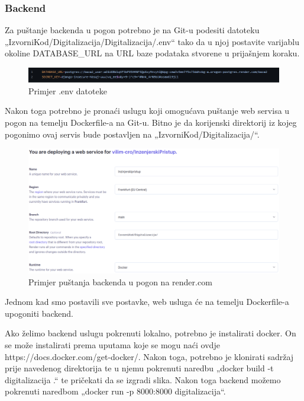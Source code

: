 			\subsubsection{Backend}

			Za puštanje backenda u pogon potrebno je na Git-u podesiti datoteku „IzvorniKod/Digitalizacija/Digitalizacija/.env“
			tako da u njoj postavite varijablu okoline DATABASE_URL na URL baze podataka stvorene u prijašnjem koraku.

			\begin{figure}[H]
				\includegraphics[width=\textwidth]{slike/envFile.png}
				\caption{Primjer .env datoteke}
				\label{fig:env_datoteka}
			\end{figure}

			Nakon toga potrebno je pronaći uslugu koji omogućava puštanje web servisa u pogon na temelju Dockerfile-a na Git-u.
			Bitno je da korijenski direktorij iz kojeg pogonimo ovaj servis bude postavljen na „IzvorniKod/Digitalizacija/“. 

			\begin{figure}[H]
				\includegraphics[width=\textwidth]{slike/deployingBackend.png}
				\caption{Primjer puštanja backenda u pogon na render.com}
				\label{fig:deploying-backend}
			\end{figure}

			Jednom kad smo postavili sve postavke, web usluga će na temelju Dockerfile-a upogoniti backend.

			Ako želimo backend uslugu pokrenuti lokalno, potrebno je instalirati docker. On se može instalirati prema uputama
			koje se mogu naći ovdje https://docs.docker.com/get-docker/.
			Nakon toga, potrebno je klonirati sadržaj prije navedenog direktorija te u njemu pokrenuti naredbu
			„docker build -t digitalizacija .“ te pričekati da se izgradi slika. Nakon toga backend možemo pokrenuti naredbom
			„docker run -p 8000:8000 digitalizacija“.

